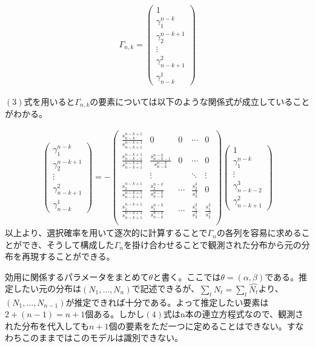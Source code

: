 \documentclass{jsarticle}
\begin{document}
\begin{align}
	\Gamma_{n, k} =
	\begin{pmatrix}
		1\\[8pt]
		\gamma_1^{n-k}\\[8pt]
		\gamma_2^{n-k+1}\\[8pt]
		\vdots\\[8pt]
		\gamma_{n-k+1}^2\\[8pt]
		\gamma_{n-k}^1
	\end{pmatrix}
\end{align}

$(3)$式を用いると$\Gamma_{n,k}$の要素については以下のような関係式が成立していることがわかる。

\begin{align}
	\begin{pmatrix}
		\gamma_1^{n-k}\\[8pt]
		\gamma_2^{n-k+1}\\[8pt]
		\vdots\\[8pt]
		\gamma_{n-k+1}^2\\[8pt]
		\gamma_{n-k}^1
	\end{pmatrix} = -
	\begin{pmatrix}
		\frac{s_{n-k}^{n-k+1}}{s_{n-k+1}^{n-k+1}} & 0 &0 &\cdots & 0\\[8pt]
		\frac{s_{n-k-1}^{n-k+1}}{s_{n-k+1}^{n-k+1}} & \frac{s_{n-k-1}^{n-k}}{s_{n-k}^{n-k}} & 0& \cdots & 0\\[8pt]
		 &\vdots && \ddots & \vdots\\[8pt]
		\frac{s_{2}^{n-k+1}}{s_{n-k+1}^{n-k+1}} & \frac{s_{2}^{n-k}}{s_{n-k}^{n-k}} & \cdots & \frac{s_2^3}{s_3^3} & 0\\[8pt]
		\frac{s_{1}^{n-k+1}}{s_{n-k+1}^{n-k+1}} & \frac{s_{1}^{n-k}}{s_{n-k}^{n-k}} & \cdots & \frac{s_1^3}{s_3^3} & \frac{s_1^2}{s_2^2}\\[8pt]
	\end{pmatrix}
	\begin{pmatrix}
		1\\[8pt]
		\gamma_1^{n-k}\\[8pt]
		\vdots\\[8pt]
		\gamma_{n-k-2}^{3}\\[8pt]
		\gamma_{n-k+1}^2
	\end{pmatrix}
\end{align}
以上より、選択確率を用いて逐次的に計算することで$\Gamma_n$の各列を容易に求めることができ、そうして構成した$\Gamma_n$を掛け合わせることで観測された分布から元の分布を再現することができる。

効用に関係するパラメータをまとめて$\theta$と書く。ここでは$\theta = (\alpha, \beta)$である。推定したい元の分布は$(N_1, \dots, N_n)$で記述できるが、$\sum_t N_t = \sum_t \hat{N_t}$より、$(N_1, \dots, N_{n-1})$が推定できれば十分である。よって推定したい要素は$2 + (n-1) = n+1$個ある。しかし$(4)$式はn本の連立方程式なので、観測された分布を代入しても$n+1$個の要素をただ一つに定めることはできない。すなわちこのままではこのモデルは識別できない。
\end{document}
